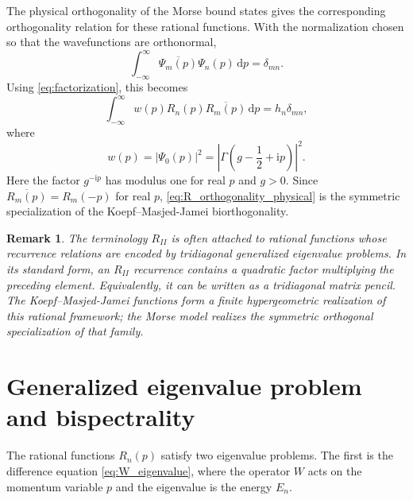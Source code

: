 \documentclass[10pt,a4paper]{amsart}
\newcommand{\ii}{\mathrm{i}}
\newcommand{\dd}{\mathrm{d}}
\numberwithin{equation}{section}
\newtheorem{remark}[theorem]{Remark}
\begin{document}
The physical orthogonality of the Morse bound states gives the corresponding orthogonality
relation for these rational functions.  With the normalization chosen so that the wavefunctions are
orthonormal,
\begin{equation}
  \int_{-\infty}^{\infty}
  \overline{\Psi_m(p)}\Psi_n(p)\,\dd p=\delta_{mn}.
\end{equation}
Using \eqref{eq:factorization}, this becomes
\begin{equation}
  \int_{-\infty}^{\infty}
  w(p)R_n(p)\overline{R_m(p)}\,\dd p=h_n\delta_{mn},
  \label{eq:R_orthogonality_physical}
\end{equation}
where
\begin{equation}
  w(p)=|\Psi_0(p)|^2
  =\left|\Gamma\!\left(g-\frac12+\ii p\right)\right|^2.
  \label{eq:weight}
\end{equation}
Here the factor $g^{-\ii p}$ has modulus one for real $p$ and $g>0$.  Since
$\overline{R_m(p)}=R_m(-p)$ for real $p$, \eqref{eq:R_orthogonality_physical} is the symmetric
specialization of the Koepf--Masjed-Jamei biorthogonality.

\begin{remark}
The terminology $R_{II}$ is often attached to rational functions whose recurrence relations are
encoded by tridiagonal generalized eigenvalue problems.  In its standard form, an $R_{II}$
recurrence contains a quadratic factor multiplying the preceding element.  Equivalently, it can be
written as a tridiagonal matrix pencil.  The Koepf--Masjed-Jamei functions form a finite
hypergeometric realization of this rational framework; the Morse model realizes the symmetric
orthogonal specialization of that family.
\end{remark}

\section{Generalized eigenvalue problem and bispectrality}\label{sec:gevp}

The rational functions $R_n(p)$ satisfy two eigenvalue problems.  The first is the difference
equation \eqref{eq:W_eigenvalue}, where the operator $W$ acts on the momentum variable $p$ and
the eigenvalue is the energy $E_n$.
\end{document}
